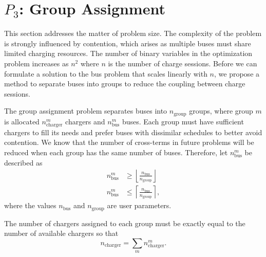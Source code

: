 \section{$P_3$: Group Assignment\label{sec:groupAssignment}}

This section addresses the matter of problem size.  The complexity of the problem is strongly influenced by contention, which arises as multiple buses must share limited charging resources.  The number of binary variables in the optimization problem increases as $n^2$ where $n$ is the number of charge sessions.
Before we can formulate a solution to the bus problem that scales linearly with $n$, we propose a method to separate buses into groups to reduce the coupling between charge sessions.

\par The group assignment problem separates buses into $n_{\text{group}}$ groups, where group $m$ is allocated $n^m_{\text{charger}}$ chargers and $n^m_{\text{bus}}$ buses. Each group must have sufficient chargers to fill its needs and prefer buses with dissimilar schedules to better avoid contention. 
We know that the number of cross-terms in future problems will be reduced when each group has the same number of buses. Therefore, let $n^m_{\text{bus}}$ be described as
\begin{equation}\label{eqn:groups:nBusPerGroup}\begin{aligned}
	n^m_{\text{bus}} &\ge \left \lfloor \frac{n_{\text{bus}}}{n_{\text{group}}} \right \rfloor \\
	n^m_{\text{bus}} &\le \left \lceil \frac{n_{\text{bus}}}{n_{\text{group}}} \right \rceil,
\end{aligned}\end{equation}
where the values $n_\text{bus}$ and $n_\text{group}$ are user parameters.

\par The number of chargers assigned to each group must be exactly equal to the number of available chargers so that
\begin{equation}\label{eqn:groups:nTotalCharger}
	n_{\text{charger}} = \sum_mn_{\text{charger}}^m.
\end{equation}
      
